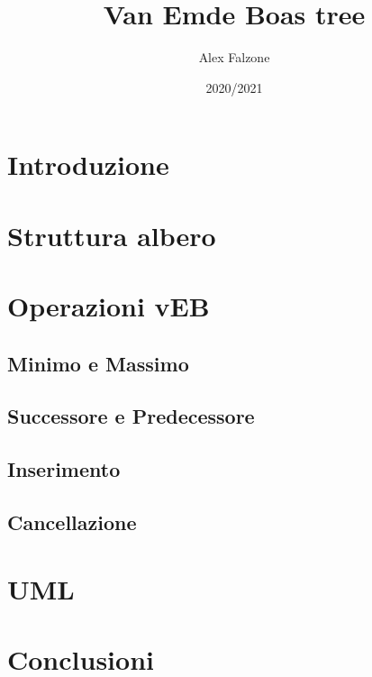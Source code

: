 \documentclass{article}
\title{\textbf{Van Emde Boas tree}}
\author{Alex Falzone }
\date{2020/2021}
\begin{document}
\maketitle
\section{Introduzione}
\section{Struttura albero}
\section{Operazioni vEB}
\vspace*{10pt}\subsection{Minimo e Massimo}
\subsection{Successore e Predecessore}
\subsection{Inserimento}
\subsection{Cancellazione}
\section{UML}
\section{Conclusioni}
\newpage
\end{document}

